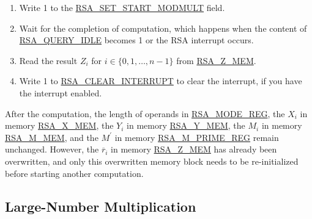 \documentclass[main\_\_EN.tex]{subfiles}
\begin{document}
\begin{enumerate}
        Users need to write data to each memory block only according to the length of the number; data beyond this length are ignored.

    \item Write 1 to the \hyperref[fielddesc:RSASETSTARTMODMULT]{RSA\_SET\_START\_MODMULT} field.

    \item Wait for the completion of computation, which happens when the content of \hyperref[fielddesc:RSAQUERYIDLE]{RSA\_QUERY\_IDLE} becomes 1 or the RSA interrupt occurs.

    \item Read the result \begin{math}Z_{i}\end{math} for \begin{math}i \in \{ 0, 1, \dots, n-1 \} \end{math} from \hyperref[tab:rsa-mem]{RSA\_Z\_MEM}.
    \item Write 1 to \hyperref[fielddesc:RSACLEARINTERRUPT]{RSA\_CLEAR\_INTERRUPT} to clear the interrupt, if you have the interrupt enabled.

\end{enumerate}

After the computation, the length of operands in \hyperref[regdesc:RSAMODEREG]{RSA\_MODE\_REG}, the \begin{math}X_{i}\end{math} in memory \hyperref[tab:rsa-mem]{RSA\_X\_MEM}, the \begin{math}Y_{i}\end{math} in memory \hyperref[tab:rsa-mem]{RSA\_Y\_MEM}, the \begin{math}M_{i}\end{math} in memory \hyperref[tab:rsa-mem]{RSA\_M\_MEM}, and the \begin{math}M^{\prime}\end{math} in memory \hyperref[regdesc:RSAMPRIMEREG]{RSA\_M\_PRIME\_REG} remain unchanged. However, the \begin{math}\overline{r}_{i}\end{math} in memory \hyperref[tab:rsa-mem]{RSA\_Z\_MEM} has already been overwritten, and only this overwritten memory block needs to be re-initialized before starting another computation.

\subsection{Large-Number Multiplication}
\end{document}
